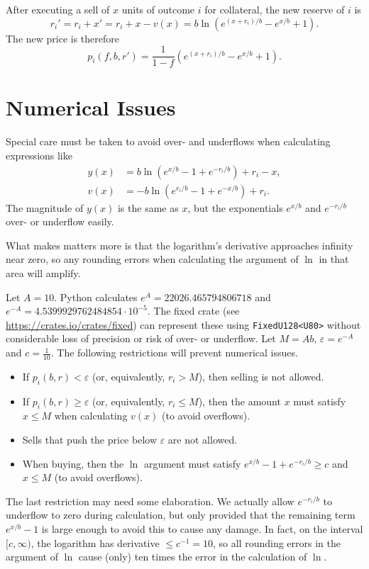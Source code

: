 \documentclass[12pt]{article}
\begin{document}
After executing a sell of $x$ units of outcome $i$ for collateral, the new reserve of $i$ is
\[
    r_i' = r_i + x' = r_i + x - v(x) = b \ln (e^{(x + r_i)/b} - e^{x/b} + 1).
\]
The new price is therefore
\[
    p_i(f, b, r') = \frac{1}{1-f} (e^{(x + r_i)/b} - e^{x/b} + 1).
\]

\section{Numerical Issues}

Special care must be taken to avoid over- and underflows when calculating expressions like
\begin{align*}
    y(x) &= b \ln (e^{x/b} - 1 + e^{-r_i/b}) + r_i - x, \\
    v(x) &= -b \ln (e^{r_i/b} - 1 + e^{-x/b}) + r_i.
\end{align*}
The magnitude of $y(x)$ is the same as $x$, but the exponentials $e^{x/b}$ and $e^{-r_i/b}$ over- or underflow easily.

What makes matters more is that the logarithm's derivative approaches infinity near zero, so any rounding errors when calculating the argument of $\ln$ in that area will amplify.

Let $A = 10$. Python calculates $e^A = 22026.465794806718$ and $e^{-A} = 4.5399929762484854 \cdot 10^{-5}$. The fixed crate (see \url{https://crates.io/crates/fixed}) can represent these using \texttt{FixedU128<U80>} without considerable loss of precision or risk of over- or underflow. Let $M = Ab$, $\varepsilon = e^{-A}$ and $c = \frac{1}{10}$. The following restrictions will prevent numerical issues.

\begin{itemize}
    \item If $p_i(b, r) < \varepsilon$ (or, equivalently, $r_i > M$), then selling is not allowed.
    \item If $p_i(b, r) \geq \varepsilon$ (or, equivalently, $r_i \leq M$), then the amount $x$ must satisfy $x \leq M$ when calculating $v(x)$ (to avoid overflows).
    \item Sells that push the price below $\varepsilon$ are not allowed.
    \item When buying, then the $\ln$ argument must satisfy $e^{x/b} - 1 + e^{-r_i/b} \geq c$ and $x \leq M$ (to avoid overflows).
\end{itemize}

The last restriction may need some elaboration. We actually allow $e^{-r_i/b}$ to underflow to zero during calculation, but only provided that the remaining term $e^{x/b} - 1$ is large enough to avoid this to cause any damage. In fact, on the interval $[c, \infty)$, the logarithm has derivative $\leq c^{-1} = 10$, so all rounding errors in the argument of $\ln$ cause (only) ten times the error in the calculation of $\ln$. 
\end{document}
